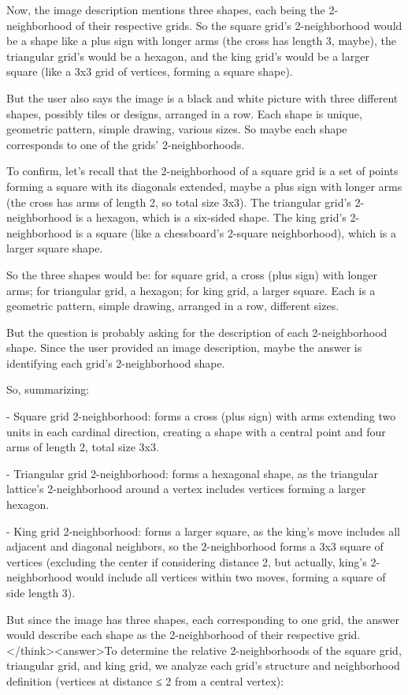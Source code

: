 Now, the image description mentions three shapes, each being the 2-neighborhood of their respective grids. So the square grid's 2-neighborhood would be a shape like a plus sign with longer arms (the cross has length 3, maybe), the triangular grid's would be a hexagon, and the king grid's would be a larger square (like a 3x3 grid of vertices, forming a square shape). 

But the user also says the image is a black and white picture with three different shapes, possibly tiles or designs, arranged in a row. Each shape is unique, geometric pattern, simple drawing, various sizes. So maybe each shape corresponds to one of the grids' 2-neighborhoods. 

To confirm, let's recall that the 2-neighborhood of a square grid is a set of points forming a square with its diagonals extended, maybe a plus sign with longer arms (the cross has arms of length 2, so total size 3x3). The triangular grid's 2-neighborhood is a hexagon, which is a six-sided shape. The king grid's 2-neighborhood is a square (like a chessboard's 2-square neighborhood), which is a larger square shape. 

So the three shapes would be: for square grid, a cross (plus sign) with longer arms; for triangular grid, a hexagon; for king grid, a larger square. Each is a geometric pattern, simple drawing, arranged in a row, different sizes. 

But the question is probably asking for the description of each 2-neighborhood shape. Since the user provided an image description, maybe the answer is identifying each grid's 2-neighborhood shape. 

So, summarizing:

- Square grid 2-neighborhood: forms a cross (plus sign) with arms extending two units in each cardinal direction, creating a shape with a central point and four arms of length 2, total size 3x3.

- Triangular grid 2-neighborhood: forms a hexagonal shape, as the triangular lattice's 2-neighborhood around a vertex includes vertices forming a larger hexagon.

- King grid 2-neighborhood: forms a larger square, as the king's move includes all adjacent and diagonal neighbors, so the 2-neighborhood forms a 3x3 square of vertices (excluding the center if considering distance 2, but actually, king's 2-neighborhood would include all vertices within two moves, forming a square of side length 3).

But since the image has three shapes, each corresponding to one grid, the answer would describe each shape as the 2-neighborhood of their respective grid.</think><answer>To determine the relative 2-neighborhoods of the square grid, triangular grid, and king grid, we analyze each grid’s structure and neighborhood definition (vertices at distance ≤ 2 from a central vertex):  

